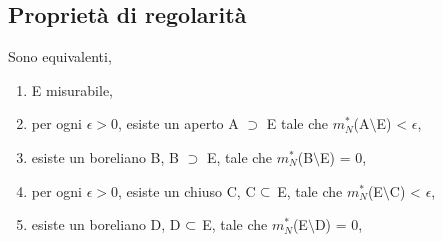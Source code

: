 \documentclass[Completo.tex]{subfiles}
\begin{document}
	\subsection{Proprietà di regolarità}
	\begin{eTh}
		Sono equivalenti,
		\begin{enumerate}
			\item E misurabile,
			\item per ogni $\epsilon > 0$, esiste un aperto A $\supset$ E tale che $m_N^{*}$(A$\setminus$E) < $\epsilon$,
			\item esiste un boreliano B, B $\supset$ E, tale che $m_N^{*}$(B$\setminus$E) = 0,
			\item per ogni $\epsilon > 0$, esiste un chiuso C, C $\subset$ E, tale che $m_N^{*}$(E$\setminus$C) < $\epsilon$,
			\item esiste un boreliano D, D $\subset$ E, tale che $m_N^{*}$(E$\setminus$D) = 0,
		\end{enumerate}
	\end{eTh}
\end{document}
